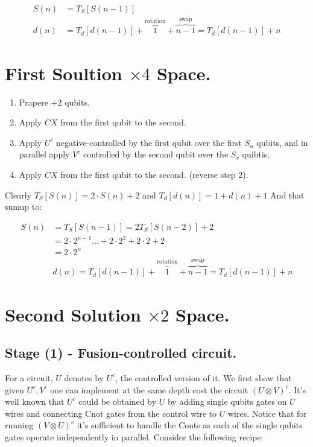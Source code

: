 \documentclass[manuscript,screen,review]{acmart}
\begin{document}
\begin{equation*}
\begin{split} 
S(n) &= T_{S}[S(n-1)]    \\
d(n) &= T_{d}[d(n-1)] + \overbrace{1}^{ \text{rotation} } + \overbrace{n-1}^{\text{swap}} =  T_{d}[d(n-1)] + n  
\end{split} 
\end{equation*}



\section{First Soultion $\times 4$ Space.}
\begin{enumerate}
  \item Prapere $+2$ qubits.
  \item Apply $CX$ from the first qubit to the second.
  \item Apply $U^{c}$ negative-controlled by the first qubit over the first $S_{u}$ qubits, and in parallel apply $V^{c}$ controlled by the second qubit over the $S_{v}$ quibtis.   
  \item Apply $CX$ from the first qubit to the second. (reverse step 2).
\end{enumerate}
Clearly $T_{S}[S(n)] = 2 \cdot S(n) + 2$ and $T_{d}[d(n)] = 1 + d(n) + 1$ And that sumup to:

\begin{equation*}
\begin{split}
  S(n) &  = T_{S}[S(n-1)] = 2T_{S}[S(n-2)] + 2   \\
  & = 2\cdot 2^{n - 1}...+2\cdot 2^{2} +2\cdot 2 + 2  \\
  & = 2\cdot 2^{n}  \\ 
  & d(n) = T_{d}[d(n-1)] + \overbrace{1}^{ \text{rotation} } + \overbrace{n-1}^{\text{swap}} =  T_{d}[d(n-1)] + n 
\end{split} 
\end{equation*}

\section{Second Solution $\times 2$ Space. }

\subsection{Stage (1) - Fusion-controlled circuit.}

For a circuit, $U$ denotes by $U^{c}$, the controlled version of it. We first show that given $U^{c},V^{c}$ one can implement at the same depth cost the circuit $(U\otimes V)^{c}$. It's well known that $U^{c}$ could be obtained by $U$ by adding single qubits gates on $U$ wires and connecting Cnot gates from the control wire to $U$ wires. Notice that for running $(V\otimes U)^{c}$ it's sufficient to handle the Conts as each of the single qubits gates operate independently in parallel. Consider the following recipe: 
\end{document}
